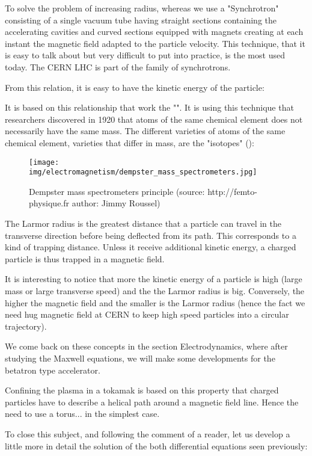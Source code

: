 	To solve the problem of increasing radius, whereas we use a "Synchrotron" consisting of a single vacuum tube having straight sections containing the accelerating cavities and curved sections equipped with magnets creating at each instant the magnetic field adapted to the particle velocity. This technique, that it is easy to talk about but very difficult to put into practice, is the most used today. The CERN LHC is part of the family of synchrotrons.

	From this relation, it is easy to have the kinetic energy of the particle:
	
	It is based on this relationship that work the "". It is using this technique that researchers discovered in 1920 that atoms of the same chemical element does not necessarily have the same mass. The different varieties of atoms of the same chemical element, varieties that differ in mass, are the "isotopes" ():
	\begin{figure}[H]
		\centering
		\texttt{[image: img/electromagnetism/dempster\_mass\_spectrometers.jpg]}
		\caption{Dempster mass spectrometers principle (source:  http://femto-physique.fr author: Jimmy Roussel)}
	\end{figure}
	The Larmor radius is the greatest distance that a particle can travel in the transverse direction before being deflected from its path. This corresponds to a kind of trapping distance. Unless it receive additional kinetic energy, a charged particle is thus trapped in a magnetic field.
	
	It is interesting to notice that more the kinetic energy of a particle is high (large mass or large transverse speed) and the the Larmor radius is big. Conversely, the higher the magnetic field and the smaller is the Larmor radius (hence the fact we need hug magnetic field at CERN to keep high speed particles into a circular trajectory).

	We come back on these concepts in the section Electrodynamics, where after studying the Maxwell equations, we will make some developments for the betatron type accelerator.
	\begin{tcolorbox}[title=Remark,colframe=black,arc=10pt]
	Confining the plasma in a tokamak is based on this property that charged particles have to describe a helical path around a magnetic field line. Hence the need to use a torus... in the simplest case.
	\end{tcolorbox}
	To close this subject, and following the comment of a reader, let us develop a little more in detail the solution of the both differential equations seen previously:
	

